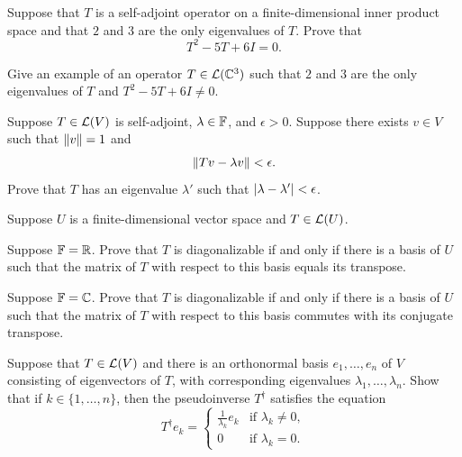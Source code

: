 \begin{exc}
\begin{exercise}
Suppose that $T$ is a self-adjoint operator on a finite-dimensional inner
product space and that $2$ and $3$ are the only eigenvalues of $T$. Prove that
\[ T^2-5T+6I = 0. \]
\end{exercise}

\begin{exercise}
Give an example of an operator $T\in\mathcal{L}(\mathbb{C}^3)$ such that $2$ and $3$ are the
only eigenvalues of $T$ and $T^2-5T+6I\ne0$.
\end{exercise}

\begin{exercise}
Suppose $T\in\mathcal{L}(V)$ is self-adjoint, $\lambda\in\mathbb{F}$, and $\epsilon>0$.
Suppose there exists $v\in V$ such that $\lVert v \rVert=1$ and
\[ \lVert Tv-\lambda v \rVert < \epsilon. \]
Prove that $T$ has an eigenvalue $\lambda'$ such that
$\lvert \lambda-\lambda' \rvert<\epsilon$.
\end{exercise}

\begin{exercise}
Suppose $U$ is a finite-dimensional vector space and $T\in\mathcal{L}(U)$.
\begin{parts}
\item Suppose $\mathbb{F}=\mathbb{R}$. Prove that $T$ is diagonalizable if and only if there is
  a basis of $U$ such that the matrix of $T$ with respect to this basis equals
  its transpose.
\item Suppose $\mathbb{F}=\mathbb{C}$. Prove that $T$ is diagonalizable if and only if there is
  a basis of $U$ such that the matrix of $T$ with respect to this basis
  commutes with its conjugate transpose.
\end{parts}
\end{exercise}

\begin{exercise}
Suppose that $T\in\mathcal{L}(V)$ and there is an orthonormal basis $e_1,\dots,e_n$ of
$V$ consisting of eigenvectors of $T$, with corresponding eigenvalues
$\lambda_1,\dots,\lambda_n$. Show that if $k\in\{1,\dots,n\}$, then the
pseudoinverse $T^\dagger$ satisfies the equation
\[ T^\dagger e_k = \begin{cases} \frac{1}{\lambda_k}e_k & \text{if }
   \lambda_k\ne0,\\ 0 & \text{if } \lambda_k=0. \end{cases} \]
\end{exercise}
\end{exc}
